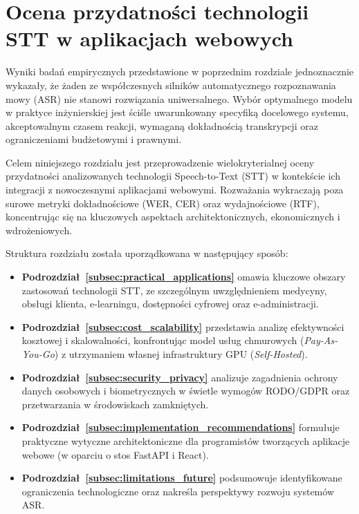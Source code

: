 \section{Ocena przydatności technologii STT w aplikacjach webowych}
\label{ch:stt_web_assessment}

Wyniki badań empirycznych przedstawione w poprzednim rozdziale jednoznacznie wykazały, że żaden ze współczesnych silników automatycznego rozpoznawania mowy (ASR) nie stanowi rozwiązania uniwersalnego. Wybór optymalnego modelu w praktyce inżynierskiej jest ściśle uwarunkowany specyfiką docelowego systemu, akceptowalnym czasem reakcji, wymaganą dokładnością transkrypcji oraz ograniczeniami budżetowymi i prawnymi.

Celem niniejszego rozdziału jest przeprowadzenie wielokryterialnej oceny przydatności analizowanych technologii Speech-to-Text (STT) w kontekście ich integracji z nowoczesnymi aplikacjami webowymi. Rozważania wykraczają poza surowe metryki dokładnościowe (WER, CER) oraz wydajnościowe (RTF), koncentrując się na kluczowych aspektach architektonicznych, ekonomicznych i wdrożeniowych.

Struktura rozdziału została uporządkowana w następujący sposób:
\begin{itemize}
    \item \textbf{Podrozdział~\ref{subsec:practical_applications}} omawia kluczowe obszary zastosowań technologii STT, ze szczególnym uwzględnieniem medycyny, obsługi klienta, e-learningu, dostępności cyfrowej oraz e-administracji.
    \item \textbf{Podrozdział~\ref{subsec:cost_scalability}} przedstawia analizę efektywności kosztowej i skalowalności, konfrontując model usług chmurowych (\textit{Pay-As-You-Go}) z utrzymaniem własnej infrastruktury GPU (\textit{Self-Hosted}).
    \item \textbf{Podrozdział~\ref{subsec:security_privacy}} analizuje zagadnienia ochrony danych osobowych i biometrycznych w świetle wymogów RODO/GDPR oraz przetwarzania w środowiskach zamkniętych.
    \item \textbf{Podrozdział~\ref{subsec:implementation_recommendations}} formułuje praktyczne wytyczne architektoniczne dla programistów tworzących aplikacje webowe (w oparciu o stos FastAPI i React).
    \item \textbf{Podrozdział~\ref{subsec:limitations_future}} podsumowuje identyfikowane ograniczenia technologiczne oraz nakreśla perspektywy rozwoju systemów ASR.
\end{itemize}

